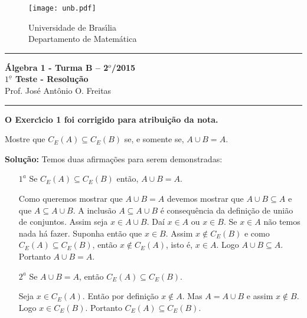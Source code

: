 \documentclass[12pt]{article}
\newcounter{exercicios}
\newcommand{\questao}{
\addtocounter{exercicios}{1}
\noindent{\bf Exerc{\'\i}cio \arabic{exercicios}: }}
\begin{document}
\pagestyle{empty}

\begin{figure}[h]
        \begin{minipage}[c]{1.7cm}
        \texttt{[image: unb.pdf]}
        \end{minipage}%
        \hspace{0pt}
        \begin{minipage}[c]{4in}
          {Universidade de Bras{\'\i}lia} \\
          {Departamento de Matem{\'a}tica}
\end{minipage}
\end{figure}
\vspace{-1cm}\hrule

\begin{center}
{\Large\bf {\'A}lgebra 1 - Turma B -- 2$^{o}$/2015} \\ \vspace{9pt} {\large\bf
  $1^{\underline{o}}$ Teste - Resolu\c{c}\~ao}\\
\vspace{9pt} Prof. Jos{\'e} Ant{\^o}nio O. Freitas
\end{center}
\hrule

\vspace{.6cm}

\textbf{O Exerc{\'\i}cio 1 foi corrigido para atribui\c{c}\~ao da nota.}

\vspace{.6cm}

\questao Mostre que $C_E(A) \subseteq C_E(B)$ se, e somente se, $A \cup B = A$.

\noindent\textbf{Solu\c{c}\~ao:} Temos duas afirmações para serem demonstradas:
\begin{enumerate}
	\item[$1^a$] Se $C_E(A) \subseteq C_E(B)$ então, $A \cup B = A$.

	Como queremos mostrar que $A \cup B = A$ devemos mostrar que $A \cup B \subseteq A$ e que $A \subseteq A \cup B$. A inclusão $A \subseteq A \cup B$ é consequência da definição de união de conjuntos. Assim seja $x \in A \cup B$. Daí $x \in A$ ou $x \in B$. Se $x \in A$ não temos nada há fazer. Suponha então que $x \in B$. Assim $x \notin C_E(B)$ e como $C_E(A) \subseteq C_E(B)$, então $x \notin C_E(A)$, isto é, $x \in A$. Logo $A \cup B \subseteq A$. Portanto $A \cup B = A$.

	\item[$2^a$] Se $A \cup B = A$, então $C_E(A) \subseteq C_E(B)$.

	Seja $x \in C_E(A)$. Então por definição $x \notin A$. Mas $A = A \cup B$ e assim $x \notin B$. Logo $x \in C_E(B)$. Portanto $C_E(A) \subseteq C_E(B)$.
\end{enumerate}
\end{document}
